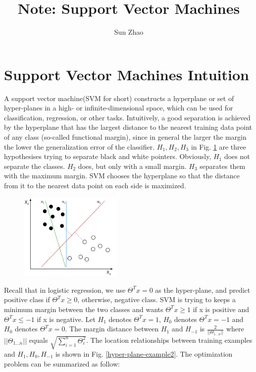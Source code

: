\documentclass{article}
\title{Note: Support Vector Machines}
\author{Sun Zhao}
\begin{document}
\maketitle
\newpage

\section{Support Vector Machines Intuition}
 A support vector machine(SVM for short) constructs a hyperplane or set of hyper-planes in a high- or infinite-dimensional space, which can be used for classification, regression, or other tasks. Intuitively, a good separation is achieved by the hyperplane that has the largest distance to the nearest training data point of any class (so-called functional margin), since in general the larger the margin the lower the generalization error of the classifier. $H_{1}, H_{2}, H_{3}$ in Fig. \ref{hyper-plane-example1} are three hypothesises trying to separate black and white pointers. Obviously, $H_{1}$ does not separate the classes. $H_{2}$ does, but only with a small margin. $H_{3}$ separates them with the maximum margin. SVM chooses the hyperplane so that the distance from it to the nearest data point on each side is maximized.
\begin{figure}[ht]
  \centering
  \includegraphics[width=5cm]{Figure1.jpg}\\
  \caption{}\label{hyper-plane-example1}
\end{figure}
 Recall that in logistic regression, we use $\Theta^{T}x = 0$ as the hyper-plane, and predict positive class if $\Theta^{T}x \ge 0$, otherwise, negative class. SVM is trying to keeps a minimum margin between the two classes and wants $\Theta^{T}x \ge 1$ if x is positive and $\Theta^{T}x \le -1$ if x is negative. Let $H_{1}$ denotes $\Theta^{T}x = 1$, $H_{0}$ denotes $\Theta^{T}x = -1$ and $H_{0}$ denotes $\Theta^{T}x = 0$. The margin distance between $H_{1}$ and $H_{-1}$ is $\frac{2}{||\Theta_{1 \ldots n}||}$ where $||\Theta_{1 \ldots n}||$ equals $\sqrt{\sum_{i = 1}^{n} \Theta_{i}^{2}}$. The location relationships between training examples and $H_{1}, H_{0}, H_{-1}$ is shown in Fig. \ref{hyper-plane-example2}. The optimization problem can be summarized as follow:\\
\end{document}
